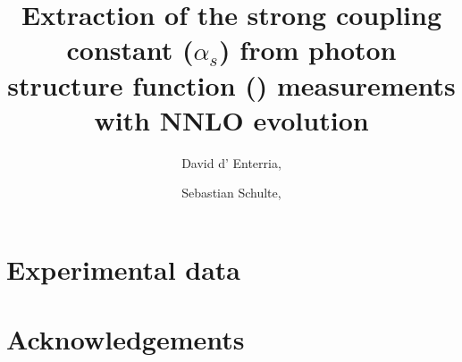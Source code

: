 \documentclass[a4paper,11pt,notoc]{article}
\title{Extraction of the strong coupling constant ($\alpha_s$) from photon structure function (\Ftwo) measurements  with NNLO evolution  }
\author[a]{David d' Enterria,}
\author[a]{Sebastian Schulte,}
\affiliation[a]{\mpi}
\affiliation[b]{Theoretical Physics Department, CERN, CH-1211 Geneva 23, Switzerland} }
\def\ait#1{{\color{red}[~\textbf{#1}~]}}
\begin{document}



\maketitle


\label{sec:ExData}

\section{Experimental data}






\section*{Acknowledgements}








\end{document}
